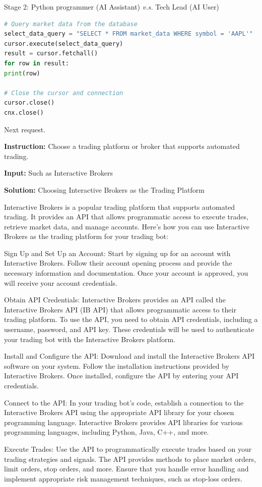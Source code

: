 \begin{AIBoxBreak}{Stage 2: Python programmer (AI Assistant) \textit{v.s.} Tech Lead (AI User)}
\begin{lstlisting}[language=Python]
# Query market data from the database
select_data_query = "SELECT * FROM market_data WHERE symbol = 'AAPL'"
cursor.execute(select_data_query)
result = cursor.fetchall()
for row in result:
print(row)

# Close the cursor and connection
cursor.close()
cnx.close()
\end{lstlisting}

Next request.


\usermsg

\textbf{Instruction:} Choose a trading platform or broker that supports automated trading.

\textbf{Input:} Such as Interactive Brokers

\assistantmsg

\textbf{Solution:} Choosing Interactive Brokers as the Trading Platform

Interactive Brokers is a popular trading platform that supports automated trading. It provides an API that allows programmatic access to execute trades, retrieve market data, and manage accounts. Here’s how you can use Interactive Brokers as the trading platform for your trading bot:

Sign Up and Set Up an Account: Start by signing up for an account with Interactive Brokers. Follow their account opening process and provide the necessary information and documentation. Once your account is approved, you will receive your account credentials.

Obtain API Credentials: Interactive Brokers provides an API called the Interactive Brokers API (IB API) that allows programmatic access to their trading platform. To use the API, you need to obtain API credentials, including a username, password, and API key. These credentials will be used to authenticate your trading bot with the Interactive Brokers platform.

Install and Configure the API: Download and install the Interactive Brokers API software on your system. Follow the installation instructions provided by Interactive Brokers. Once installed, configure the API by entering your API credentials.

Connect to the API: In your trading bot’s code, establish a connection to the Interactive Brokers API using the appropriate API library for your chosen programming language. Interactive Brokers provides API libraries for various programming languages, including Python, Java, C++, and more.

Execute Trades: Use the API to programmatically execute trades based on your trading strategies and signals. The API provides methods to place market orders, limit orders, stop orders, and more. Ensure that you handle error handling and implement appropriate risk management techniques, such as stop-loss orders.


\end{AIBoxBreak}
